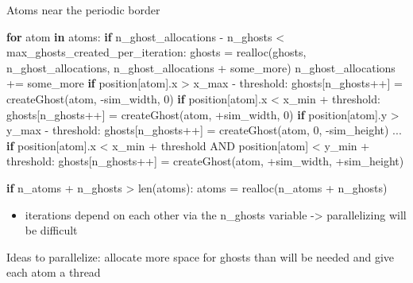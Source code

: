 \documentclass[ignorenonframetext,]{beamer}
\newenvironment{Shaded}{}{}
\newcommand{\BuiltInTok}[1]{#1}
\newcommand{\ControlFlowTok}[1]{\textcolor[rgb]{0.00,0.44,0.13}{\textbf{#1}}}
\newcommand{\DecValTok}[1]{\textcolor[rgb]{0.25,0.63,0.44}{#1}}
\newcommand{\KeywordTok}[1]{\textcolor[rgb]{0.00,0.44,0.13}{\textbf{#1}}}
\newcommand{\NormalTok}[1]{#1}
\newcommand{\OperatorTok}[1]{\textcolor[rgb]{0.40,0.40,0.40}{#1}}
\providecommand{\tightlist}{%
  \setlength{\itemsep}{0pt}\setlength{\parskip}{0pt}}
\begin{document}
\begin{frame}[fragile]
\begin{block}{Atoms near the periodic border}
\begin{Shaded}
\begin{Highlighting}[]
  \ControlFlowTok{for}\NormalTok{ atom }\KeywordTok{in}\NormalTok{ atoms:}
    \ControlFlowTok{if}\NormalTok{ n_ghost_allocations }\OperatorTok{-}\NormalTok{ n_ghosts }\OperatorTok{<}\NormalTok{ max_ghosts_created_per_iteration:}
\NormalTok{      ghosts }\OperatorTok{=}\NormalTok{ realloc(ghosts, n_ghost_allocations, n_ghost_allocations }\OperatorTok{+}\NormalTok{ some_more)}
\NormalTok{      n_ghost_allocations }\OperatorTok{+=}\NormalTok{ some_more}
    \ControlFlowTok{if}\NormalTok{ position[atom].x }\OperatorTok{>}\NormalTok{ x_max }\OperatorTok{-}\NormalTok{ threshold:}
\NormalTok{      ghosts[n_ghosts}\OperatorTok{++}\NormalTok{] }\OperatorTok{=}\NormalTok{ createGhost(atom, }\OperatorTok{-}\NormalTok{sim_width, }\DecValTok{0}\NormalTok{)}
    \ControlFlowTok{if}\NormalTok{ position[atom].x }\OperatorTok{<}\NormalTok{ x_min }\OperatorTok{+}\NormalTok{ threshold:}
\NormalTok{      ghosts[n_ghosts}\OperatorTok{++}\NormalTok{] }\OperatorTok{=}\NormalTok{ createGhost(atom, }\OperatorTok{+}\NormalTok{sim_width, }\DecValTok{0}\NormalTok{)}
    \ControlFlowTok{if}\NormalTok{ position[atom].y }\OperatorTok{>}\NormalTok{ y_max }\OperatorTok{-}\NormalTok{ threshold:}
\NormalTok{      ghosts[n_ghosts}\OperatorTok{++}\NormalTok{] }\OperatorTok{=}\NormalTok{ createGhost(atom, }\DecValTok{0}\NormalTok{, }\OperatorTok{-}\NormalTok{sim_height)}
\NormalTok{    ...}
    \ControlFlowTok{if}\NormalTok{ position[atom].x }\OperatorTok{<}\NormalTok{ x_min }\OperatorTok{+}\NormalTok{ threshold AND position[atom] }\OperatorTok{<}\NormalTok{ y_min }\OperatorTok{+}\NormalTok{ threshold:}
\NormalTok{      ghosts[n_ghosts}\OperatorTok{++}\NormalTok{] }\OperatorTok{=}\NormalTok{ createGhost(atom, }\OperatorTok{+}\NormalTok{sim_width, }\OperatorTok{+}\NormalTok{sim_height)}
  
  \ControlFlowTok{if}\NormalTok{ n_atoms }\OperatorTok{+}\NormalTok{ n_ghosts }\OperatorTok{>} \BuiltInTok{len}\NormalTok{(atoms):}
\NormalTok{    atoms }\OperatorTok{=}\NormalTok{ realloc(n_atoms }\OperatorTok{+}\NormalTok{ n_ghosts)}
\end{Highlighting}
\end{Shaded}

\begin{itemize}
\tightlist
\item
  iterations depend on each other via the n\_ghosts variable
  -\textgreater{} parallelizing will be difficult
\end{itemize}

Ideas to parallelize: allocate more space for ghosts than will be needed
and give each atom a thread


\end{block}
\end{frame}
\end{document}
